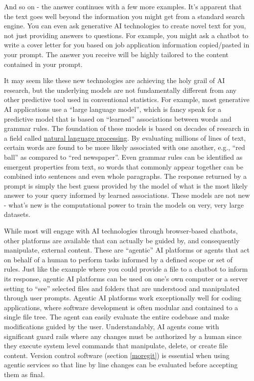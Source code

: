 \documentclass[
]{book}
\begin{document}
And so on - the answer continues with a few more examples. It's apparent that the text goes well beyond the information you might get from a standard search engine. You can even ask generative AI technologies to create novel text for you, not just providing answers to questions. For example, you might ask a chatbot to write a cover letter for you based on job application information copied/pasted in your prompt. The answer you receive will be highly tailored to the content contained in your prompt.

It may seem like these new technologies are achieving the holy grail of AI research, but the underlying models are not fundamentally different from any other predictive tool used in conventional statistics. For example, most generative AI applications use a ``large language model'', which is fancy speak for a predictive model that is based on ``learned'' associations between words and grammar rules. The foundation of these models is based on decades of research in a field called \href{https://en.wikipedia.org/wiki/Natural_language_processing}{natural language processing}. By evaluating millions of lines of text, certain words are found to be more likely associated with one another, e.g., ``red ball'' as compared to ``red newspaper''. Even grammar rules can be identified as emergent properties from text, so words that commonly appear together can be combined into sentences and even whole paragraphs. The response returned by a prompt is simply the best guess provided by the model of what is the most likely answer to your query informed by learned associations. These models are not new - what's new is the computational power to train the models on very, very large datasets.

While most will engage with AI technologies through browser-based chatbots, other platforms are available that can actually be guided by, and consequently manipulate, external content. These are ``agentic'' AI platforms or agents that act on behalf of a human to perform tasks informed by a defined scope or set of rules. Just like the example where you could provide a file to a chatbot to inform its response, agentic AI platforms can be used on one's own computer or a server setting to ``see'' selected files and folders that are understood and manipulated through user prompts. Agentic AI platforms work exceptionally well for coding applications, where software development is often modular and contained to a single file tree. The agent can easily evaluate the entire codebase and make modifications guided by the user. Understandably, AI agents come with significant guard rails where any changes must be authorized by a human since they execute system level commands that manipulate, delete, or create file content. Version control software (section \ref{moregit}) is essential when using agentic services so that line by line changes can be evaluated before accepting them as final.
\end{document}
